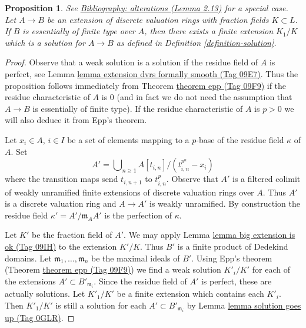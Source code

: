 \documentclass{amsart}
\newenvironment{reference}{\comment}{\endcomment}
\theoremstyle{plain}
\newtheorem{proposition}[subsection]{Proposition}
\theoremstyle{definition}
\theoremstyle{remark}
\numberwithin{equation}{subsection}
\begin{document}
\begin{proposition}
\label{proposition-epp-essentially-finite-type}
\begin{reference}
See \href{https://stacks.math.columbia.edu/bibliography}{Bibliography: alterations (Lemma 2.13)} for a special case.
\end{reference}
Let $A \to B$ be an extension of discrete valuation rings with fraction
fields $K \subset L$. If $B$ is essentially of finite type over $A$, then
there exists a finite extension $K_1/K$ which is a solution for
$A \to B$ as defined in
Definition \ref{definition-solution}.
\end{proposition}

\begin{proof}
Observe that a weak solution is a solution if the residue field of $A$
is perfect, see Lemma \href{https://stacks.math.columbia.edu/tag/09E7}{lemma extension dvrs formally smooth (Tag 09E7)}.
Thus the proposition follows immediately from Theorem \href{https://stacks.math.columbia.edu/tag/09F9}{theorem epp (Tag 09F9)}
if the residue characteristic of $A$ is $0$ (and in fact we do not need
the assumption that $A \to B$ is essentially of finite type).
If the residue characteristic of $A$ is $p > 0$ we will also deduce it from
Epp's theorem.

\medskip\noindent
Let $x_i \in A$, $i \in I$ be a set of elements mapping to a $p$-base of
the residue field $\kappa$ of $A$. Set
$$
A' = \bigcup\nolimits_{n \geq 1} A[t_{i, n}]/(t_{i, n}^{p^n} - x_i)
$$
where the transition maps send $t_{i, n + 1}$ to $t_{i, n}^p$. Observe
that $A'$ is a filtered colimit of weakly unramified finite extensions
of discrete valuation rings over $A$. Thus $A'$ is a discrete valuation
ring and $A \to A'$ is weakly unramified. By construction the residue field
$\kappa' = A'/\mathfrak m_A A'$ is the perfection of $\kappa$.

\medskip\noindent
Let $K'$ be the fraction field of $A'$.
We may apply Lemma \href{https://stacks.math.columbia.edu/tag/09IH}{lemma big extension is ok (Tag 09IH)}
to the extension $K'/K$. Thus $B'$ is a finite product of
Dedekind domains. Let $\mathfrak m_1, \ldots, \mathfrak m_n$ be the
maximal ideals of $B'$. Using Epp's theorem (Theorem \href{https://stacks.math.columbia.edu/tag/09F9}{theorem epp (Tag 09F9)})
we find a weak solution $K'_i/K'$ for each of the
extensions $A' \subset B'_{\mathfrak m_i}$. Since the residue field
of $A'$ is perfect, these are actually solutions. Let $K'_1/K'$
be a finite extension which contains each $K'_i$. Then $K'_1/K'$
is still a solution for each $A' \subset B'_{\mathfrak m_i}$ by
Lemma \href{https://stacks.math.columbia.edu/tag/0GLR}{lemma solution goes up (Tag 0GLR)}.


\end{proof}
\end{document}
